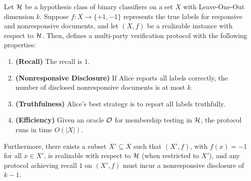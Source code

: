 \begin{theorem}\label{thm:protocol_realizable}
    Let $\mathcal{H}$ be a hypothesis class of binary classifiers on a set $X$ with Leave-One-Out dimension $k$.  
    Suppose $f: X \to \{+1,-1\}$ represents the true labels for responsive and nonresponsive documents, and let $(X,f)$ be a realizable instance with respect to $\mathcal{H}$. Then,  defines a multi-party verification protocol with the following properties:
    \begin{enumerate}
        \item \textbf{(Recall)} The recall is $1$.
        \item \textbf{(Nonresponsive Disclosure)} If Alice reports all labels correctly, the number of disclosed nonresponsive documents is at most $k$.
        \item \textbf{(Truthfulness)} Alice's best strategy is to report all labels truthfully.
        \item \textbf{(Efficiency)} Given an oracle $\mathcal{O}$ for membership testing in $\mathcal{H}$, the protocol runs in time $O(|X|)$.
    \end{enumerate}
    Furthermore, there exists a subset $X' \subseteq X$ such that $(X', f)$, with $f(x) = -1$ for all $x \in X'$, is realizable with respect to $\mathcal{H}$ (when restricted to $X'$), and any protocol achieving recall $1$ on $(X', f)$ must incur a nonresponsive disclosure of $k-1$.

\end{theorem}




%





% 